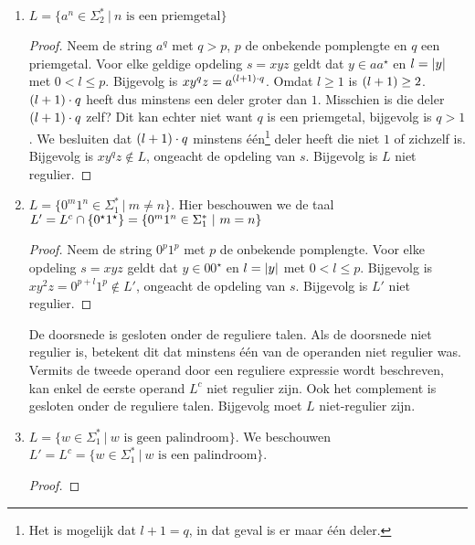 \documentclass[a4paper]{article}
\begin{document}
\begin{question}
\begin{answer}
\begin{enumerate}
\begin{proof}
  Neem de string $a^{2^p}$ met $p$ de onbekende pomplengte. Voor elke geldige opdeling $s=xyz$ geldt dat $y\in aa^{\star}$ en $l=\abs{a}$ met $0<l\leq p$. Bijgevolg is $xy^2z=a^{2^p+l}$. $2^p+l$ is enkel een macht van $2$ indien $l=2^p$ of groter, maar omdat $l\leq p$ en $\forall i\in\NNN:i<2^i$ weten we ook dat $l<2^p$, bijgevolg kan $2^p+l$ geen macht van $2$ zijn. Bijgevolg is $xy^2z\notin L$, ongeacht de opdeling van $s$. Bijgevolg is $L$ niet regulier.
 \end{proof}
 \item $L=\{ a^n \in \Sigma_2^*\ | \ \mbox{$n$ is een priemgetal} \}$
 \begin{proof}
  Neem de string $a^{q}$ met $q>p$, $p$ de onbekende pomplengte en $q$ een priemgetal. Voor elke geldige opdeling $s=xyz$ geldt dat $y\in aa^{\star}$ en $l=\left|y\right|$ met $0<l\leq p$. Bijgevolg is $xy^qz=a^{\left( l+1 \right)\cdot q}$. Omdat $l\geq 1$ is $\left( l+1 \right)\geq 2$. $\left( l+1 \right)\cdot q$ heeft dus minstens een deler groter dan $1$. Misschien is die deler $\left( l+1 \right)\cdot q$ zelf? Dit kan echter niet want $q$ is een priemgetal, bijgevolg is $q>1$. We besluiten dat $\left( l+1 \right)\cdot q$ minstens \'e\'en\footnote{Het is mogelijk dat $l+1=q$, in dat geval is er maar \'e\'en deler.} deler heeft die niet $1$ of zichzelf is. Bijgevolg is $xy^qz\notin L$, ongeacht de opdeling van $s$. Bijgevolg is $L$ niet regulier.
 \end{proof}
  \item $L=\{ 0^m1^n \in \Sigma_1^* \ | \ m \neq n \}$. Hier beschouwen we de taal $L'=L^c\cap\left\{ 0^{\star}1^{\star} \right\}=\{ 0^m1^n \in \Sigma_1^* \ | \ m=n \}$
 \begin{proof}
  Neem de string $0^p1^p$ met $p$ de onbekende pomplengte. Voor elke opdeling $s=xyz$ geldt dat $y\in 00^{\star}$ en $l=\left|y\right|$ met $0<l\leq p$. Bijgevolg is $xy^2z=0^{p+l}1^p\notin L'$, ongeacht de opdeling van $s$. Bijgevolg is $L'$ niet regulier.
 \end{proof}
 De doorsnede is gesloten onder de reguliere talen. Als de doorsnede niet regulier is, betekent dit dat minstens \'e\'en van de operanden niet regulier was. Vermits de tweede operand door een reguliere expressie wordt beschreven, kan enkel de eerste operand $L^c$ niet regulier zijn. Ook het complement is gesloten onder de reguliere talen. Bijgevolg moet $L$ niet-regulier zijn.
 \item $L=\{ w \in \Sigma_1^* \ | \ \mbox{$w$ is geen palindroom} \}$. We beschouwen $L'=L^c=\{ w \in \Sigma_1^* \ | \ \mbox{$w$ is een palindroom} \}$.
 \begin{proof}

\end{proof}
\end{enumerate}
\end{answer}
\end{question}
\end{document}
